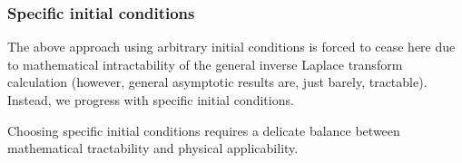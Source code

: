 \documentclass{aastex61}
\begin{document}
\subsubsection{Specific initial conditions}
The above approach using arbitrary initial conditions is forced to cease here due to mathematical intractability of the general inverse Laplace transform calculation (however, general asymptotic results are, just barely, tractable). Instead, we progress with specific initial conditions. 

Choosing specific initial conditions requires a delicate balance between mathematical tractability and physical applicability.




\end{document}

